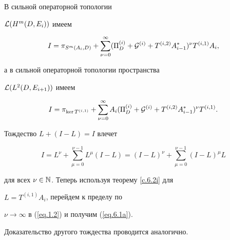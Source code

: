 \begin{thm}


\label{t.6.3i} В сильной операторной топологии


${\cal L} (H^{m} (D, E_i))$ имеем


\begin{equation} \label{eq.6.1a}


I =\pi_{S ^m (A_i, D)}+ \sum_{\nu=0}^{\infty}


(\Pi ^{(i)}_{D}+{\cal G}^{(i)}+T^{(i,2)} A^*_{i-1}


)^{\nu} T^{(i,1)} A_i,


\end{equation}


а в сильной операторной топологии пространства


${\cal L} (L^{2} (D, E_{i+1}))$ имеем


\begin{equation}


I= \pi_{\ker T^{(i,1)} }+ \sum_{\nu=0}^{\infty}


A_i (\Pi ^{(i)}_{D}+{\cal G}^{(i)}+T^{(i,2)} A^*_{i-1}


)^{\nu} T^{(i,1)} .


\label{eq.6.3i}


\end{equation}


\end{thm}








\begin{pf}


Тождество $L+(I-L)=I$ влечет


\begin{equation} \label{eq.1.2}


I=L^\nu+\sum_{\mu=0}^{\nu -1} L^\mu (I-L)=(I-L)^\nu


+\sum_{\mu=0}^{\nu -1} (I-L)^\mu L


\end{equation}


для всех $\nu \in \Bbb N$. Теперь используя теорему \ref{c.6.2i} для


$L =T^{(i,1)}  A_{i}$, перейдем к пределу по


$\nu \to \infty$ в (\ref{eq.1.2}) и получим (\ref{eq.6.1a}).


Доказательство другого тождества проводится аналогично.


\end{pf}








